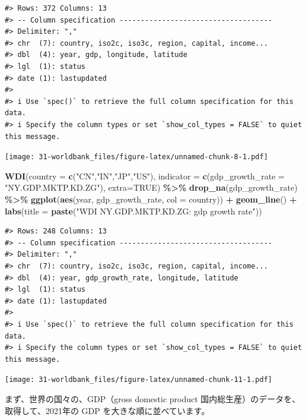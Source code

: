\documentclass[
  xelatex, ja=standard]{bxjsbook}
\newenvironment{Shaded}{\begin{snugshade}}{\end{snugshade}}
\newcommand{\AttributeTok}[1]{\textcolor[rgb]{0.13,0.29,0.53}{#1}}
\newcommand{\ConstantTok}[1]{\textcolor[rgb]{0.56,0.35,0.01}{#1}}
\newcommand{\FunctionTok}[1]{\textcolor[rgb]{0.13,0.29,0.53}{\textbf{#1}}}
\newcommand{\NormalTok}[1]{#1}
\newcommand{\SpecialCharTok}[1]{\textcolor[rgb]{0.81,0.36,0.00}{\textbf{#1}}}
\newcommand{\StringTok}[1]{\textcolor[rgb]{0.31,0.60,0.02}{#1}}
\theoremstyle{definition}
\theoremstyle{definition}
\theoremstyle{definition}
\theoremstyle{definition}
\theoremstyle{remark}
\begin{document}
\begin{verbatim}
#> Rows: 372 Columns: 13
#> -- Column specification ------------------------------------
#> Delimiter: ","
#> chr  (7): country, iso2c, iso3c, region, capital, income...
#> dbl  (4): year, gdp, longitude, latitude
#> lgl  (1): status
#> date (1): lastupdated
#> 
#> i Use `spec()` to retrieve the full column specification for this data.
#> i Specify the column types or set `show_col_types = FALSE` to quiet this message.
\end{verbatim}

\texttt{[image: 31-worldbank\_files/figure-latex/unnamed-chunk-8-1.pdf]}

\begin{Shaded}
\begin{Highlighting}[]
\FunctionTok{WDI}\NormalTok{(}\AttributeTok{country =} \FunctionTok{c}\NormalTok{(}\StringTok{"CN"}\NormalTok{,}\StringTok{"IN"}\NormalTok{,}\StringTok{"JP"}\NormalTok{,}\StringTok{"US"}\NormalTok{), }
    \AttributeTok{indicator =} \FunctionTok{c}\NormalTok{(}\AttributeTok{gdp\_growth\_rate =} \StringTok{"NY.GDP.MKTP.KD.ZG"}\NormalTok{), }\AttributeTok{extra=}\ConstantTok{TRUE}\NormalTok{) }\SpecialCharTok{\%\textgreater{}\%}
  \FunctionTok{drop\_na}\NormalTok{(gdp\_growth\_rate) }\SpecialCharTok{\%\textgreater{}\%} 
  \FunctionTok{ggplot}\NormalTok{(}\FunctionTok{aes}\NormalTok{(year, gdp\_growth\_rate, }\AttributeTok{col =}\NormalTok{ country)) }\SpecialCharTok{+} \FunctionTok{geom\_line}\NormalTok{() }\SpecialCharTok{+}
  \FunctionTok{labs}\NormalTok{(}\AttributeTok{title =} \FunctionTok{paste}\NormalTok{(}\StringTok{"WDI NY.GDP.MKTP.KD.ZG: gdp growth rate"}\NormalTok{))}
\end{Highlighting}
\end{Shaded}

\begin{verbatim}
#> Rows: 248 Columns: 13
#> -- Column specification ------------------------------------
#> Delimiter: ","
#> chr  (7): country, iso2c, iso3c, region, capital, income...
#> dbl  (4): year, gdp_growth_rate, longitude, latitude
#> lgl  (1): status
#> date (1): lastupdated
#> 
#> i Use `spec()` to retrieve the full column specification for this data.
#> i Specify the column types or set `show_col_types = FALSE` to quiet this message.
\end{verbatim}

\texttt{[image: 31-worldbank\_files/figure-latex/unnamed-chunk-11-1.pdf]}

まず、世界の国々の、GDP（gross domestic product 国内総生産）のデータを、取得して、2021年の GDP を大きな順に並べています。
\end{document}
